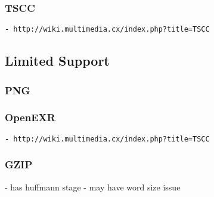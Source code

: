 \subsubsection{TSCC}

{\scriptsize
\begin{verbatim}
- http://wiki.multimedia.cx/index.php?title=TSCC
\end{verbatim}}

\subsection{Limited Support}

\subsubsection{PNG}

\subsubsection{OpenEXR}

{\scriptsize
\begin{verbatim}
- http://wiki.multimedia.cx/index.php?title=TSCC
\end{verbatim}}

\subsubsection{GZIP}
- has huffmann stage
- may have word size issue
